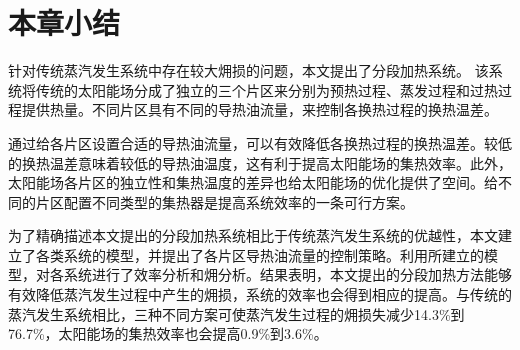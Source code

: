 \section{本章小结}

针对传统蒸汽发生系统中存在较大㶲损的问题，本文提出了分段加热系统。
该系统将传统的太阳能场分成了独立的三个片区来分别为预热过程、蒸发过程和过热过程提供热量。不同片区具有不同的导热油流量，来控制各换热过程的换热温差。

通过给各片区设置合适的导热油流量，可以有效降低各换热过程的换热温差。较低的换热温差意味着较低的导热油温度，这有利于提高太阳能场的集热效率。此外，太阳能场各片区的独立性和集热温度的差异也给太阳能场的优化提供了空间。给不同的片区配置不同类型的集热器是提高系统效率的一条可行方案。

为了精确描述本文提出的分段加热系统相比于传统蒸汽发生系统的优越性，本文建立了各类系统的模型，并提出了各片区导热油流量的控制策略。利用所建立的模型，对各系统进行了效率分析和㶲分析。结果表明，本文提出的分段加热方法能够有效降低蒸汽发生过程中产生的㶲损，系统的效率也会得到相应的提高。与传统的蒸汽发生系统相比，三种不同方案可使蒸汽发生过程的㶲损失减少14.3\%到76.7\%，太阳能场的集热效率也会提高0.9\%到3.6\%。